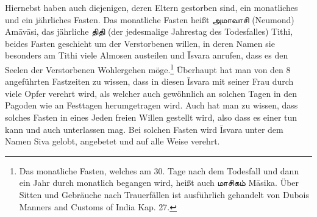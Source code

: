 \documentclass{article}
\newcommand{\TamilText}[1]{\texttamil{#1}}
\newcommand{\tam}[1]{\TamilText{#1}}
\begin{document}
Hiernebst haben auch diejenigen, deren Eltern gestorben sind, ein monatliches und ein jährliches Fasten. Das monatliche Fasten heißt \tam{அமாவாசி} (Neumond) Am\={a}v\={a}si, das jährliche \tam{திதி} (der jedesmalige Jahrestag des Todesfalles) Tithi, beides Fasten geschieht um der Verstorbenen willen, in deren Namen sie besonders am Tithi viele Almosen austeilen und \={I}svara anrufen, dass es den Seelen der Verstorbenen Wohlergehen möge.\footnote{Das monatliche Fasten, welches am 30. Tage nach dem Todesfall und dann ein Jahr durch monatlich begangen wird, heißt auch \tam{மாசிகம்} M\={a}sika. Über Sitten und Gebräuche nach Trauerfällen ist ausführlich gehandelt von Dubois Manners and Customs of India Kap. 27.} Überhaupt hat man von den 8 angeführten Fastzeiten zu wissen, dass in diesen \={I}svara mit seiner Frau durch viele Opfer verehrt wird, als welcher auch gewöhnlich an solchen Tagen in den Pagoden wie an Festtagen herumgetragen wird. Auch hat man zu wissen, dass solches Fasten in eines Jeden freien Willen gestellt wird, also dass es einer tun kann und auch unterlassen mag. Bei solchen Fasten wird \={I}svara unter dem Namen Siva gelobt, angebetet und auf alle Weise verehrt.
\end{document}
